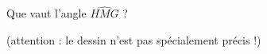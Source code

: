 
\begin{exercice}\label{exosmath-0913}

    Que vaut l'angle \( \widehat{HMG}\) ?

    \begin{center}
   
    \end{center}

    (attention : le dessin n'est pas spécialement précis !)

\end{exercice}
